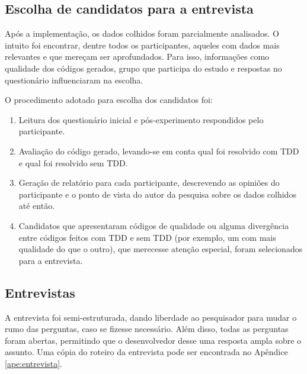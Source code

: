 \subsection{Escolha de candidatos para a entrevista}

Após a implementação, os dados colhidos foram parcialmente analisados. O intuito
foi encontrar, dentre todos os participantes, aqueles com dados mais relevantes
e que mereçam ser aprofundados.
Para isso, informações como qualidade dos códigos gerados, grupo que participa
do estudo e respostas no questionário influenciaram na escolha.

O procedimento adotado para escolha dos candidatos foi:

\begin{enumerate}
	\item Leitura dos questionário inicial e pós-experimento respondidos pelo participante.
	
	\item Avaliação do código gerado, levando-se em conta qual foi resolvido com TDD e qual
	foi resolvido sem TDD.
	
	\item Geração de relatório para cada participante, descrevendo as opiniões do participante
	e o ponto de vista do autor da pesquisa sobre os dados colhidos até então.
	
	\item Candidatos que apresentaram códigos de qualidade ou alguma divergência entre códigos
	feitos com TDD e sem TDD (por exemplo, um com mais qualidade do que o outro), que merecesse
	atenção especial, foram selecionados para a entrevista.
\end{enumerate}

\subsection{Entrevistas}
\label{sec:planejamento-estrategia-entrevistas}

A entrevista foi semi-estruturada, dando liberdade ao
pesquisador para mudar o rumo das perguntas, caso se fizesse necessário.
Além disso, todas as perguntas foram abertas, permitindo que o desenvolvedor desse
uma resposta ampla sobre o assunto. Uma cópia do roteiro da entrevista pode ser encontrada
no Apêndice \ref{ape:entrevista}.

